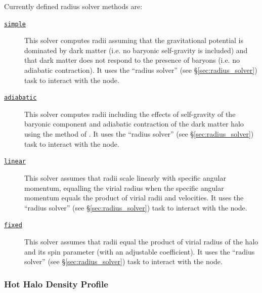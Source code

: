 Currently defined radius solver methods are:
\begin{description}
 \item [\hyperlink{galactic_structure.radius_solver.simple.F90:galactic_structure_radii_simple:galactic_structure_radii_solve_simple}{{\tt simple}}] This solver computes radii assuming that the gravitational potential is dominated by dark matter (i.e. no baryonic self-gravity is included) and that dark matter does not respond to the presence of baryons (i.e. no adiabatic contraction). It uses the ``radius solver'' (see \S\ref{sec:radius_solver}) task to interact with the node.
 \item [\hyperlink{galactic_structure.radius_solver.adiabatic.F90:galactic_structure_radii_adiabatic:galactic_structure_radii_solve_adiabatic}{{\tt adiabatic}}] This solver computes radii including the effects of self-gravity of the baryonic component and adiabatic contraction of the dark matter halo using the method of \cite{gnedin_response_2004}. It uses the ``radius solver'' (see \S\ref{sec:radius_solver}) task to interact with the node.
 \item [\hyperlink{galactic_structure.radius_solver.linear.F90:galactic_structure_radii_linear:galactic_structure_radii_solve_linear}{{\tt linear}}] This solver assumes that radii scale linearly with specific angular momentum, equalling the virial radius when the specific angular momentum equals the product of virial radii and velocities. It uses the ``radius solver'' (see \S\ref{sec:radius_solver}) task to interact with the node.
 \item [\hyperlink{galactic_structure.radius_solver.fixed.F90:galactic_structure_radii_fixed:galactic_structure_radii_solve_fixed}{{\tt fixed}}] This solver assumes that radii equal the product of virial radius of the halo and its spin parameter (with an adjustable coefficient). It uses the ``radius solver'' (see \S\ref{sec:radius_solver}) task to interact with the node.
\end{description}

\subsubsection{Hot Halo Density Profile}

